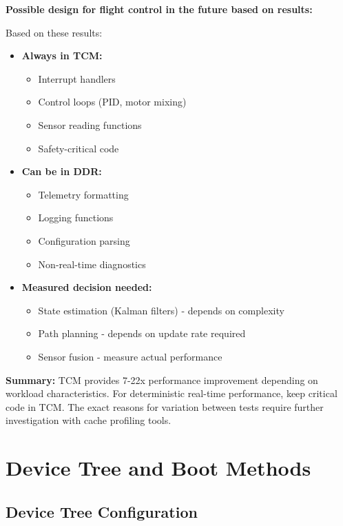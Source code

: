 \documentclass[12pt,a4paper]{report}
\begin{document}
\textbf{Possible design for flight control in the future based on results:}

Based on these results:
\begin{itemize}
    \item \textbf{Always in TCM:}
    \begin{itemize}
        \item Interrupt handlers
        \item Control loops (PID, motor mixing)
        \item Sensor reading functions
        \item Safety-critical code
    \end{itemize}
    
    \item \textbf{Can be in DDR:}
    \begin{itemize}
        \item Telemetry formatting
        \item Logging functions
        \item Configuration parsing
        \item Non-real-time diagnostics
    \end{itemize}
    
    \item \textbf{Measured decision needed:}
    \begin{itemize}
        \item State estimation (Kalman filters) - depends on complexity
        \item Path planning - depends on update rate required
        \item Sensor fusion - measure actual performance
    \end{itemize}
\end{itemize}

\textbf{Summary:} TCM provides 7-22x performance improvement depending on workload characteristics. For deterministic real-time performance, keep critical code in TCM. The exact reasons for variation between tests require further investigation with cache profiling tools.

\section{Device Tree and Boot Methods}
\label{sec:remoteproc}

\subsection{Device Tree Configuration}
\end{document}
